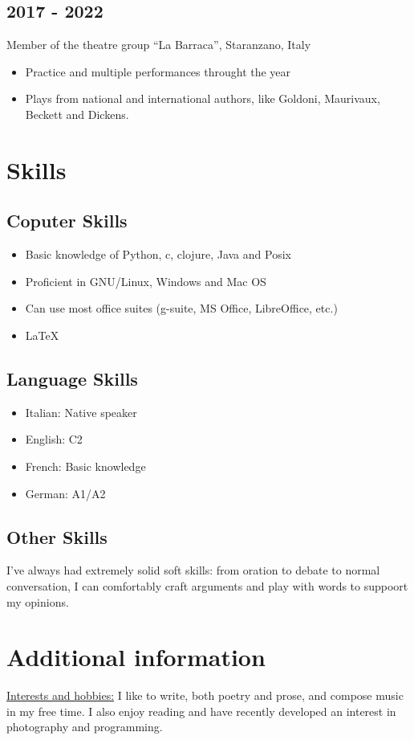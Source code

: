 \documentclass[12pt]{article}
\begin{document}
	\subsection{2017 - 2022}
	Member of the theatre group “La Barraca”, Staranzano, Italy
 	\begin{itemize}
		\item{Practice and multiple performances throught the year}
		\item{Plays from national and international authors, like Goldoni, Maurivaux, Beckett and Dickens.}
	\end{itemize}
\section{Skills}
	\subsection{Coputer Skills}
		\begin{itemize}
			\item{Basic knowledge of Python, c, clojure, Java and Posix}
			\item{Proficient in GNU/Linux, Windows and Mac OS}
			\item{Can use most office suites (g-suite, MS Office, LibreOffice, etc.)}
			\item{\LaTeX}
		\end{itemize}
	\subsection{Language Skills}
		\begin{itemize}
			\item{Italian: Native speaker}
			\item{English: C2}
			\item{French: Basic knowledge}
			\item{German: A1/A2}
		\end{itemize}
	\subsection{Other Skills}
	I've always had extremely solid soft skills: from oration to debate to normal conversation, I can comfortably craft arguments and play with words to suppoort my opinions.

\section{Additional information}
\underline{Interests and hobbies:}
I like to write, both poetry and prose, and compose music in my free
time. I also enjoy reading and have recently developed an interest in photography and programming.
\end{document}
